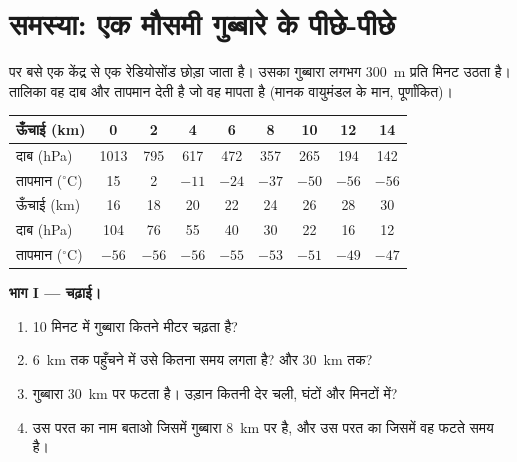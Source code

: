 \section{समस्या: एक मौसमी गुब्बारे के पीछे-पीछे}

\begin{problem}
\label{pb:g8:the-atmosphere:1}
 पर बसे एक केंद्र से एक रेडियोसोंड छोड़ा जाता है। उसका गुब्बारा लगभग
\qty{300}{m} प्रति मिनट उठता है। तालिका वह दाब और तापमान देती है जो वह मापता है (मानक
वायुमंडल के मान, पूर्णांकित)।

\begin{center}\small
\begin{tabular}{|l|*{8}{c|}}
\hline
ऊँचाई (km) & 0 & 2 & 4 & 6 & 8 & 10 & 12 & 14 \\
\hline
दाब (hPa) & 1013 & 795 & 617 & 472 & 357 & 265 & 194 & 142 \\
\hline
तापमान ($^\circ$C) & 15 & 2 & $-11$ & $-24$ & $-37$ & $-50$ & $-56$ & $-56$ \\
\hline
\hline
ऊँचाई (km) & 16 & 18 & 20 & 22 & 24 & 26 & 28 & 30 \\
\hline
दाब (hPa) & 104 & 76 & 55 & 40 & 30 & 22 & 16 & 12 \\
\hline
तापमान ($^\circ$C) & $-56$ & $-56$ & $-56$ & $-55$ & $-53$ & $-51$ & $-49$ & $-47$ \\
\hline
\end{tabular}
\end{center}

\noindent\textbf{भाग I --- चढ़ाई।}\par\nopagebreak
\begin{enumerate}[beginpenalty=10000]
  \item 10 मिनट में गुब्बारा कितने मीटर चढ़ता है?
  \item \qty{6}{km} तक पहुँचने में उसे कितना समय लगता है? और \qty{30}{km} तक?
  \item गुब्बारा \qty{30}{km} पर फटता है। उड़ान कितनी देर चली, घंटों और मिनटों
        में?
  \item उस परत का नाम बताओ जिसमें गुब्बारा \qty{8}{km} पर है, और उस परत का जिसमें
        वह फटते समय है।
\end{enumerate}


\end{problem}
